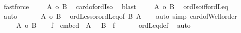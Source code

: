\begin{isabellebody}
\ fastforce\isanewline
\ \ \ \isamarkupfalse%
\ {\isachardoublequoteopen}{\isacharbar}{\kern0pt}A{\isacharbar}{\kern0pt}\ {\isacharequal}{\kern0pt}o\ {\isacharbar}{\kern0pt}B{\isacharbar}{\kern0pt}{\isachardoublequoteclose}\ \isamarkupfalse%
\ card{\isacharunderscore}{\kern0pt}of{\isacharunderscore}{\kern0pt}ordIso\ \isamarkupfalse%
\ blast\isanewline
\ \ \ \isamarkupfalse%
\ {\isachardoublequoteopen}{\isacharbar}{\kern0pt}A{\isacharbar}{\kern0pt}\ {\isasymle}o\ {\isacharbar}{\kern0pt}B{\isacharbar}{\kern0pt}{\isachardoublequoteclose}\ \isamarkupfalse%
\ ordIso{\isacharunderscore}{\kern0pt}iff{\isacharunderscore}{\kern0pt}ordLeq\ \isamarkupfalse%
\ auto\isanewline
\ \ \isacommand{{\isacharbraceright}{\kern0pt}}\isamarkupfalse%
\isanewline
\ \ \isamarkupfalse%
\ {\isachardoublequoteopen}{\isacharbar}{\kern0pt}A{\isacharbar}{\kern0pt}\ {\isasymle}o\ {\isacharbar}{\kern0pt}B{\isacharbar}{\kern0pt}{\isachardoublequoteclose}\ \isamarkupfalse%
\ ordLess{\isacharunderscore}{\kern0pt}or{\isacharunderscore}{\kern0pt}ordLeq{\isacharbrackleft}{\kern0pt}of\ {\isachardoublequoteopen}{\isacharbar}{\kern0pt}B{\isacharbar}{\kern0pt}{\isachardoublequoteclose}\ {\isachardoublequoteopen}{\isacharbar}{\kern0pt}A{\isacharbar}{\kern0pt}{\isachardoublequoteclose}{\isacharbrackright}{\kern0pt}\isanewline
\ \ \isamarkupfalse%
\ {\isacharparenleft}{\kern0pt}auto\ simp{\isacharcolon}{\kern0pt}\ card{\isacharunderscore}{\kern0pt}of{\isacharunderscore}{\kern0pt}Well{\isacharunderscore}{\kern0pt}order{\isacharparenright}{\kern0pt}\isanewline
{}\isamarkupfalse%
\isanewline
\ \ \isamarkupfalse%
\ {\isacharasterisk}{\kern0pt}{\isacharcolon}{\kern0pt}\ {\isachardoublequoteopen}{\isacharbar}{\kern0pt}A{\isacharbar}{\kern0pt}\ {\isasymle}o\ {\isacharbar}{\kern0pt}B{\isacharbar}{\kern0pt}{\isachardoublequoteclose}\isanewline
\ \ \isamarkupfalse%
\ f\ \ {\isachardoublequoteopen}embed\ {\isacharparenleft}{\kern0pt}\ {\isacharbar}{\kern0pt}A{\isacharbar}{\kern0pt}\ {\isacharparenright}{\kern0pt}\ {\isacharparenleft}{\kern0pt}\ {\isacharbar}{\kern0pt}B{\isacharbar}{\kern0pt}\ {\isacharparenright}{\kern0pt}\ f{\isachardoublequoteclose}\isanewline
\ \ \isamarkupfalse%
\ {\isacharasterisk}{\kern0pt}\ \isamarkupfalse%
\ ordLeq{\isacharunderscore}{\kern0pt}def\ \isamarkupfalse%
\ auto\isanewline
\ \ \isamarkupfalse%

\end{isabellebody}
